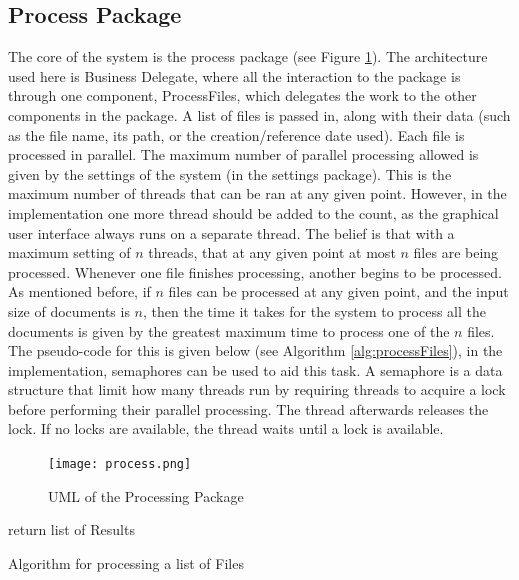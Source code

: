\subsection{Process Package}
\par The core of the system is the process package (see Figure \ref{fig:process}). The architecture used here is Business Delegate, where all the interaction to the package is through one component, ProcessFiles, which delegates the work to the other components in the package. A list of files is passed in, along with their data (such as the file name, its path, or the creation/reference date used). Each file is processed in parallel. The maximum number of parallel processing allowed is given by the settings of the system (in the settings package). This is the maximum number of threads that can be ran at any given point. However, in the implementation one more thread should be added to the count, as the graphical user interface always runs on a separate thread. The belief is that with a maximum setting of $n$ threads, that at any given point at most $n$ files are being processed. Whenever one file finishes processing, another begins to be processed. As mentioned before, if $n$ files can be processed at any given point, and the input size of documents is $n$, then the time it takes for the system to process all the documents is given by the greatest maximum time to process one of the $n$ files. The pseudo-code for this is given below (see Algorithm \ref{alg:processFiles}), in the implementation, semaphores can be used to aid this task. A semaphore is a data structure that limit how many threads run by requiring threads to acquire a lock before performing their parallel processing. The thread afterwards releases the lock. If no locks are available, the thread waits until a lock is available.
\begin{figure}[H]
\caption{UML of the Processing Package}
\label{fig:process}
\texttt{[image: process.png]}
\centering
\end{figure}
\begin{algorithm}[H]
return list of Results\;
\caption{Algorithm for processing a list of Files}
\label{alg:processFiles}
\end{algorithm}
